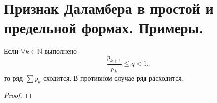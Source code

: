 \section{Признак Даламбера в простой и предельной формах. Примеры.}
\begin{theorem}
    Если $\forall k \in \mathbb{N}$ выполнено
    \[
        \frac{p_{k+1}}{p_{k}} \leqslant q < 1,
    \] то ряд $\sum p_k$ сходится. В противном случае ряд расходится.
    \begin{proof}
        
    \end{proof}
\end{theorem}